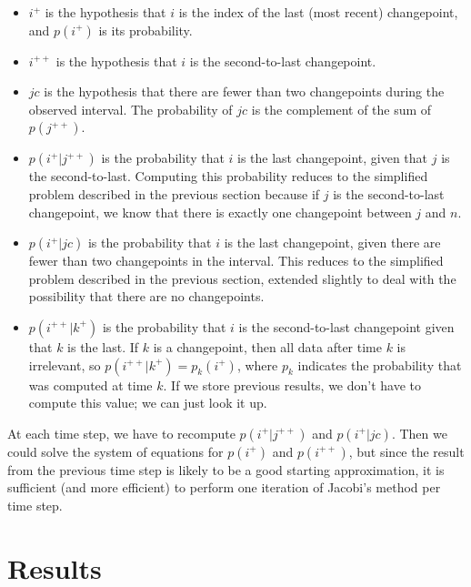 \documentclass[twocolumn,11pt]{article}
\begin{document}
\begin{itemize}

\item $i^+$ is the hypothesis that $i$ is the index of the last
(most recent) changepoint, and $p(i^+)$ is its probability.

\item $i^{++}$ is the hypothesis that $i$ is the
second-to-last changepoint.

\item $jc$ is the hypothesis that there are fewer than two
changepoints during the observed interval.  The probability
of $jc$ is the complement of the sum of $p(j^{++})$.

\item $p(i^+ | j^{++})$ is the probability that $i$ is the last
changepoint, given that $j$ is the second-to-last.  Computing this
probability reduces to the simplified problem described in the
previous section because if $j$ is the second-to-last changepoint,
we know that there is exactly one changepoint between $j$ and $n$.

\item $p(i^+ | jc)$ is the probability that $i$ is the last
changepoint, given there are fewer than two changepoints in the
interval.  This reduces to the simplified problem described in the
previous section, extended slightly to deal with the
possibility that there are no changepoints.

\item $p(i^{++} | k^+)$ is the probability that $i$ is the
second-to-last changepoint given that $k$ is the last.  If $k$ is a
changepoint, then all data after time $k$ is irrelevant, so $p(i^{++}
| k^+) = p_k(i^+)$, where $p_k$ indicates the probability that was
computed at time $k$.  If we store previous results, we don't
have to compute this value; we can just look it up.

\end{itemize}

At each time step, we have to recompute $p(i^+ | j^{++})$ and $p(i^+ |
jc)$.  Then we could solve the system of equations for $p(i^+)$ and
$p(i^{++})$, but since the result from the previous time step is
likely to be a good starting approximation, it is sufficient (and more
efficient) to perform one iteration of Jacobi's method per time step.


\section{Results}
\end{document}

